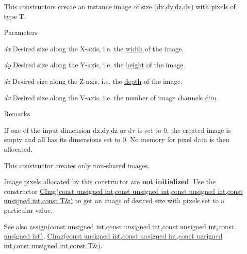This constructors create an instance image of size ({\ttfamily dx},{\ttfamily dy},{\ttfamily dz},{\ttfamily dv}) with pixels of type {\ttfamily T}. 
\begin{DoxyParams}{Parameters}
\item[{\em dx}]Desired size along the X-\/axis, i.e. the \hyperlink{structcimg__library_1_1_c_img_a5fb74a7776210bb99fd6755319ade13f}{width} of the image. \item[{\em dy}]Desired size along the Y-\/axis, i.e. the \hyperlink{structcimg__library_1_1_c_img_a30d575fd18ae525e507315de71b4806a}{height} of the image. \item[{\em dz}]Desired size along the Z-\/axis, i.e. the \hyperlink{structcimg__library_1_1_c_img_a982d5d1e153477adf7f851106fe8ee3a}{depth} of the image. \item[{\em dv}]Desired size along the V-\/axis, i.e. the number of image channels \hyperlink{structcimg__library_1_1_c_img_ac9648dfe0a26d58e6e0030a3dbca234e}{dim}. \end{DoxyParams}
\begin{DoxyRemark}{Remarks}

\begin{DoxyItemize}
\item If one of the input dimension {\ttfamily dx},{\ttfamily dy},{\ttfamily dz} or {\ttfamily dv} is set to 0, the created image is empty and all has its dimensions set to 0. No memory for pixel data is then allocated.
\item This constructor creates only non-\/shared images.
\item Image pixels allocated by this constructor are {\bfseries not} {\bfseries initialized}. Use the constructor \hyperlink{structcimg__library_1_1_c_img_ad024111e98670fe76bea4012a182790d}{CImg(const unsigned int,const unsigned int,const unsigned int,const unsigned int,const T\&)} to get an image of desired size with pixels set to a particular value. 
\end{DoxyItemize}
\end{DoxyRemark}
\begin{DoxySeeAlso}{See also}
\hyperlink{structcimg__library_1_1_c_img_a32e4857acca9063f247a025e163e41b8}{assign(const unsigned int,const unsigned int,const unsigned int,const unsigned int)}, \hyperlink{structcimg__library_1_1_c_img_ad024111e98670fe76bea4012a182790d}{CImg(const unsigned int,const unsigned int,const unsigned int,const unsigned int,const T\&)}. 
\end{DoxySeeAlso}
